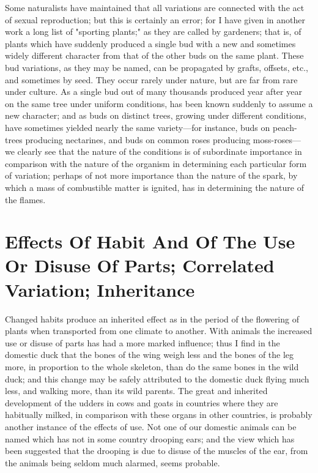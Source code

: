 Some naturalists have maintained that all variations are
connected with the act of sexual reproduction; but this is
certainly an error; for I have given in another work a long list of
"sporting plants;" as they are called by gardeners; that is, of
plants which have suddenly produced a single bud with a new and
sometimes widely different character from that of the other buds on
the same plant. These bud variations, as they may be named, can be
propagated by grafts, offsets, etc., and sometimes by seed. They
occur rarely under nature, but are far from rare under culture. As
a single bud out of many thousands produced year after year on the
same tree under uniform conditions, has been known suddenly to
assume a new character; and as buds on distinct trees, growing
under different conditions, have sometimes yielded nearly the same
variety—for instance, buds on peach- trees producing nectarines,
and buds on common roses producing moss-roses— we clearly see that
the nature of the conditions is of subordinate importance in
comparison with the nature of the organism in determining each
particular form of variation; perhaps of not more importance than
the nature of the spark, by which a mass of combustible matter is
ignited, has in determining the nature of the flames.




\section{Effects Of Habit And Of The Use Or Disuse Of Parts; Correlated Variation; Inheritance}
Changed habits produce an inherited effect as in the period of
the flowering of plants when transported from one climate to
another. With animals the increased use or disuse of parts has had
a more marked influence; thus I find in the domestic duck that the
bones of the wing weigh less and the bones of the leg more, in
proportion to the whole skeleton, than do the same bones in the
wild duck; and this change may be safely attributed to the domestic
duck flying much less, and walking more, than its wild parents. The
great and inherited development of the udders in cows and goats in
countries where they are habitually milked, in comparison with
these organs in other countries, is probably another instance of
the effects of use. Not one of our domestic animals can be named
which has not in some country drooping ears; and the view which has
been suggested that the drooping is due to disuse of the muscles of
the ear, from the animals being seldom much alarmed, seems
probable.

